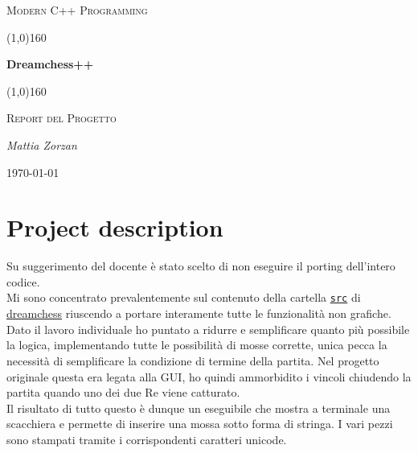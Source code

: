 \documentclass{article}
\begin{document}
    \clearpage

    \begin{titlepage}
        \centering
        \vspace*{\fill}
        {\scshape\LARGE Modern C++ Programming \par}
        \vspace{1.5cm}
        \line(1,0){160} \\
        {\huge\bfseries Dreamchess++ \par}
        \line(1,0){160} \\
        \vspace{0.5cm}
        {\scshape\LARGE Report del Progetto \par}
        \vspace{2cm}
        {\Large\itshape Mattia Zorzan \par}
        \vspace{1cm}

        \vspace{5cm}
        \vspace*{\fill}
        {\large \today \par}
    \end{titlepage}
    \thispagestyle{empty}
    \newpage
    \tableofcontents
    \thispagestyle{empty}
    \newpage
    \section{Project description}\label{sec:description}
        Su suggerimento del docente è stato scelto di non eseguire il porting dell'intero codice.\\
        Mi sono concentrato prevalentemente sul contenuto della cartella \href{https://github.com/dreamchess/dreamchess/tree/master/dreamchess/src}{\texttt{src}} di \href{https://github.com/dreamchess/dreamchess}{dreamchess} riuscendo a portare interamente tutte le funzionalità non grafiche.\\
        Dato il lavoro individuale ho puntato a ridurre e semplificare quanto più possibile la logica, implementando tutte le possibilità di mosse corrette, unica pecca la necessità di semplificare la condizione di termine della partita. Nel progetto originale questa era legata alla GUI, ho quindi ammorbidito i vincoli chiudendo la partita quando uno dei due Re viene catturato.\\
        Il risultato di tutto questo è dunque un eseguibile che mostra a terminale una scacchiera e permette di inserire una mossa sotto forma di stringa. I vari pezzi sono stampati tramite i corrispondenti caratteri unicode.  
    \newpage
\end{document}
